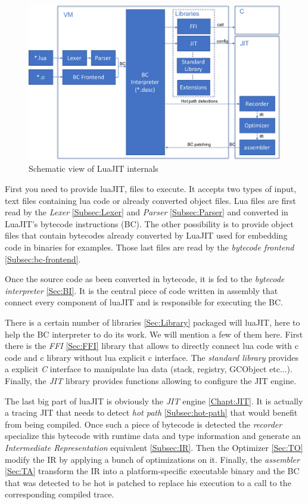 \begin{figure}[H]
    \centering
	\includegraphics[width=\textwidth]{./Images/LuaJIT.pdf}
    \caption{Schematic view of LuaJIT internals}
    \label{fig:luajit-internal}
\end{figure}{}

First you need to provide luaJIT, files to execute. It accepts two types of input,
text files containing lua code or already converted object files. Lua files are
first read by the \emph{Lexer} \ref{Subsec:Lexer} and \emph{Parser} \ref{Subsec:Parser} and
converted in LuaJIT's bytecode instructions (BC). The other possibility is to provide
object files that contain bytecodes already converted by LuaJIT used for
embedding code in binaries for examples. Those last files are read by the
\emph{bytecode frontend} \ref{Subsec:bc-frontend}.

Once the source code as been converted in bytecode, it is fed to the \emph{bytecode
interpreter} \ref{Sec:BI}. It is the central piece of code written in assembly
that connect every component of luaJIT and is responsible for executing the BC.

There is a certain number of libraries \ref{Sec:Library} packaged will luaJIT, here
to help the BC interpreter to do its work. We will mention a few of them here.
First there is the \emph{FFI} \ref{Sec:FFI} library that allows to directly connect lua
code with c code and c library without lua explicit c interface. The \emph{standard
library} provides a explicit \emph{C} interface to manipulate lua data
(stack, registry, GCObject etc...). Finally, the \emph{JIT} library provides functions
allowing to configure the JIT engine.

The last big part of luaJIT is obviously the \emph{JIT} engine \ref{Chapt:JIT}.
It is actually a tracing JIT that needs to detect \emph{hot path}
\ref{Subsec:hot-path} that would benefit from being compiled. Once such a piece
of bytecode is detected the \emph{recorder} specialize this bytecode with runtime
data and type information and generate an \emph{Intermediate Representation}
equivalent \ref{Subsec:IR}. Then the Optimizer \ref{Sec:TO} modify the IR by
applying a bunch of optimizations on it. Finally, the \emph{assembler} \ref{Sec:TA}
transform the IR into a platform-specific executable binary and the BC that was
detected to be hot is patched to replace his execution to a call to the
corresponding compiled trace.
